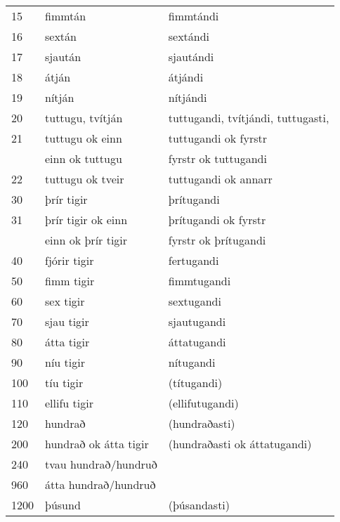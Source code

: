 \begin{longtable}{lll}
    15   & fimmtán               & fimmtándi                          \\
    16   & sextán                & sextándi                           \\
    17   & sjaután               & sjautándi                          \\
    18   & átján                 & átjándi                            \\
    19   & nítján                & nítjándi                           \\
    20   & tuttugu, tvítján      & tuttugandi, tvítjándi, tuttugasti, \\
    21   & tuttugu ok einn       & tuttugandi ok fyrstr               \\
         & einn ok tuttugu       & fyrstr ok tuttugandi               \\
    22   & tuttugu ok tveir      & tuttugandi ok annarr               \\
    30   & þrír tigir            & þrítugandi                         \\
    31   & þrír tigir ok einn    & þrítugandi ok fyrstr               \\
         & einn ok þrír tigir    & fyrstr ok þrítugandi               \\
    40   & fjórir tigir          & fertugandi                         \\
    50   & fimm tigir            & fimmtugandi                        \\
    60   & sex tigir             & sextugandi                         \\
    70   & sjau tigir            & sjautugandi                        \\
    80   & átta tigir            & áttatugandi                        \\
    90   & níu tigir             & nítugandi                          \\
    100  & tíu tigir             & (títugandi)                        \\
    110  & ellifu tigir          & (ellifutugandi)                    \\
    120  & hundrað               & (hundraðasti)                      \\
    200  & hundrað ok átta tigir & (hundraðasti ok áttatugandi)       \\
    240  & tvau hundrað/hundruð  &                                    \\
    960  & átta hundrað/hundruð  &                                    \\
    1200 & þúsund                & (þúsandasti)                       \\
\end{longtable}

